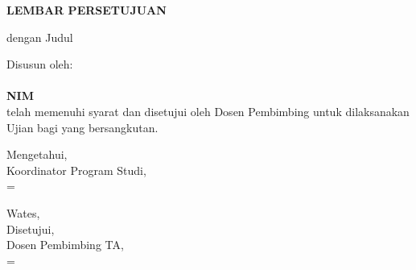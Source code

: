 
\newpage

\newcommand{\smartsignature}[2]{%
    \setbox0=\hbox{#1}%
    \ifdim\wd0>0.47\textwidth
        {\small #1\\[0.3em]#2}%
    \else
        {#1\\[0.3em]#2}%
    \fi
}

\begin{center}
    \begin{doublespace}
        \textbf{\large \MakeUppercase{lembar persetujuan}}
    \end{doublespace}
\end{center}

\begin{center}
    {\tipe} dengan Judul
\end{center}

\begin{center}
    \begin{doublespace}
        \textbf{\large \MakeUppercase {\judulid}}
    \end{doublespace}
\end{center}

\begin{center}
    Disusun oleh:\\
    \textbf{\penulis}\\
    \textbf{NIM \nim}\\[1.5cm]

    telah memenuhi syarat dan disetujui oleh Dosen Pembimbing untuk dilaksanakan Ujian {\tipe} bagi yang bersangkutan.\\[0.75cm]
\end{center}

\vspace{0.75cm}
\noindent\begin{minipage}[t]{0.47\textwidth}
    \centering
    \vspace{1.5em}
    Mengetahui,\\
    Koordinator Program Studi,\\[2.5cm]
    
    \smartsignature{\koorprodi}{NIP. \NIPkoorprodi}
\end{minipage}%
\hfill%
\begin{minipage}[t]{0.47\textwidth}
    \centering
    Wates, \tglpersetujuan\\[1em]
    Disetujui,\\
    Dosen Pembimbing TA,\\[2.5cm]
    
    \smartsignature{\pembimbing}{NIP. \NIPpembimbing}
\end{minipage}%
